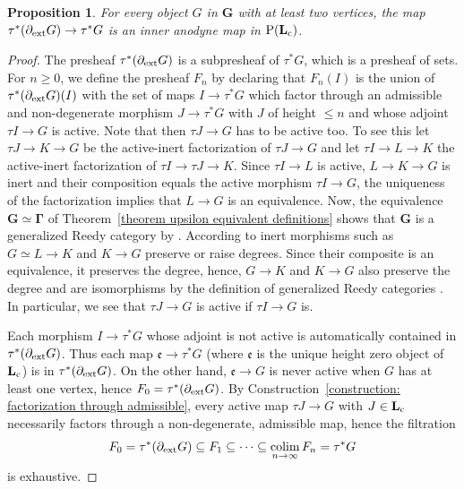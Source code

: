 \documentclass{amsart}
\numberwithin{theorem}{subsection}
\newtheorem{propn}[theorem]{Proposition}
\theoremstyle{definition}
\DeclareMathOperator*{\colim}{colim}
\newcommand{\Pre}{\name{P}}
\newcommand{\name}[1]{\ensuremath{\text{\textup{#1}}}}
\newcommand{\levelg}{\mathbf{L}}
\newcommand{\levelgconn}{\levelg_{\name{c}}}
\newcommand{\bbY}{\mathbf{G}}
\newcommand{\hryGamma}{\mathbf{\Gamma}}
\newcommand{\Dext}{\partial_{\name{ext}}}
\begin{document}
\begin{propn}\label{proposition exterior boundary inner anodyne}
For every object $G$ in $\bbY$ with at least two vertices, the map $\tau^{*} (\Dext G)  \to \tau^{*} G$ is an inner anodyne map in $\Pre(\levelgconn)$.
\end{propn}
\begin{proof}
The presheaf $\tau^{*}(\Dext G)$ is a subpresheaf of $\tau^{*}G$, which is a presheaf of sets.
For $n\geq 0$, we define the presheaf $F_{n}$ by declaring that $F_n(I)$ is the union of $\tau^{*}(\Dext G)(I)$ with the set of maps $I \to \tau^{*}G$ which factor through an admissible and non-degenerate morphism $J \to \tau^{*}G$ with $J$ of height $\leq n$ and whose adjoint $\tau I \to G$ is active. Note that then $\tau J\to G$ has to be active too. To see this let $\tau J \to K\to G$ be the active-inert factorization of $\tau J\to G$  and let $\tau I \to L \to K$ the active-inert factorization of $\tau I\to \tau J \to K$. Since $\tau I \to L$ is active, $L \to K \to G$ is inert and their composition equals the active morphism $\tau I\to G$, the uniqueness of the factorization implies that $L\to G$ is an equivalence. Now, the equivalence $\bbY\simeq \hryGamma$ of Theorem~\ref{theorem upsilon equivalent definitions} shows that $\bbY$ is a generalized Reedy category by \cite[Theorem 6.70]{hrybook}. According to \cite[Lemma 6.65]{hrybook} inert morphisms such as $G\simeq L\to K $ and $K\to G$ preserve or raise degrees. Since their composite is an equivalence, it preserves the degree, hence, $G\to K $ and $K\to G$ also preserve the degree and are isomorphisms by the definition of generalized Reedy categories \cite[Definition 1.1]{bm_reedy}. In particular, we see that $\tau J\to G$ is active if $\tau I\to G$ is.

Each morphism $I \to \tau^*G$ whose adjoint is not active is automatically contained in $\tau^{*}(\Dext G)$.
Thus each map $\mathfrak{e} \to \tau^{*}G$  (where $\mathfrak{e}$ is the unique height zero object of $\levelgconn$) is in $\tau^{*}(\Dext G)$.
On the other hand, $\mathfrak{e} \to G$ is never active when $G$ has at least one vertex, hence $F_0 = \tau^{*}(\Dext G)$.
By Construction~\ref{construction: factorization through admissible}, every active map $\tau J \to G$ with $J \in \levelgconn$ necessarily factors through a non-degenerate, admissible map, hence the filtration
\[ F_0 = \tau^{*}(\Dext G) \subseteq F_1 \subseteq \cdots \subseteq \colim_{n \to \infty} F_{n} = \tau^{*}G
\]
is exhaustive.


\end{proof}
\end{document}
